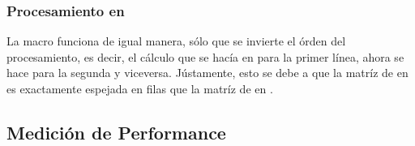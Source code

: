 \begin{center}
\end{center}

\subsubsection{Procesamiento en }
	La macro  funciona de igual manera, sólo que se invierte el órden del procesamiento, es decir, el cálculo que se hacía en 
 para la primer línea, ahora se hace para la segunda y viceversa. Jústamente, esto se debe a que la matríz de  en
 es exactamente espejada en filas que la matríz de  en .

\vspace{10mm}
\subsection{Medición de Performance}


